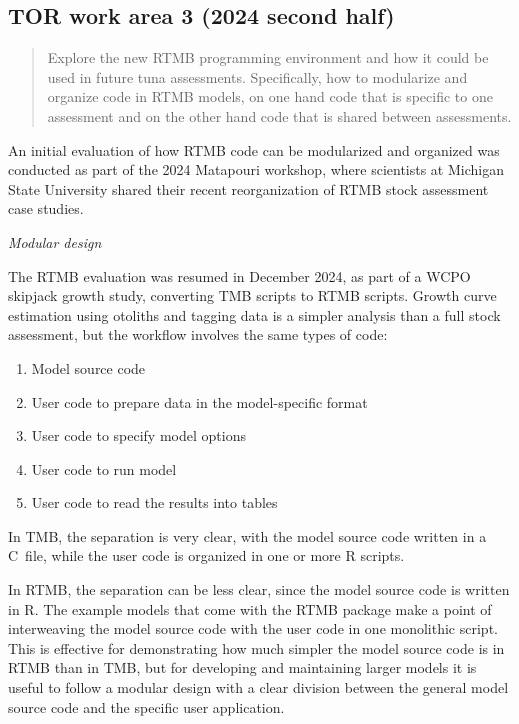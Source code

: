 \documentclass{SCreport}
\newcommand\cpp{\mbox{C\raisebox{0.5ex}{\tiny\bfseries ++}}}
\begin{document}
\subsection{TOR work area 3 (2024 second half)}

\begin{quote}\sf
  Explore the new RTMB programming environment and how it could be used in
  future tuna assessments. Specifically, how to modularize and organize code in
  RTMB models, on one hand code that is specific to one assessment and on the
  other hand code that is shared between assessments.
\end{quote}

\vspace{2ex}

An initial evaluation of how RTMB code can be modularized and organized was
conducted as part of the 2024 Matapouri workshop, where scientists at Michigan
State University shared their recent reorganization of RTMB stock assessment
case studies.

\textit{Modular design}

The RTMB evaluation was resumed in December 2024, as part of a WCPO skipjack
growth study, converting TMB scripts to RTMB scripts. Growth curve estimation
using otoliths and tagging data is a simpler analysis than a full stock
assessment, but the workflow involves the same types of code:

\begin{enumerate}
  \item Model source code\\[-4.5ex]
  \item User code to prepare data in the model-specific format\\[-4.5ex]
  \item User code to specify model options\\[-4.5ex]
  \item User code to run model\\[-4.5ex]
  \item User code to read the results into tables\\[-2.5ex]
\end{enumerate}

In TMB, the separation is very clear, with the model source code written in a
\cpp\ file, while the user code is organized in one or more R scripts.

In RTMB, the separation can be less clear, since the model source code is
written in R. The example models that come with the RTMB package make a point of
interweaving the model source code with the user code in one monolithic script.
This is effective for demonstrating how much simpler the model source code is in
RTMB than in TMB, but for developing and maintaining larger models it is useful
to follow a modular design with a clear division between the general model
source code and the specific user application.
\end{document}
